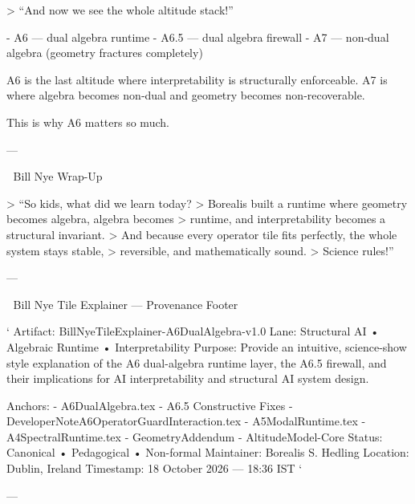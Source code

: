 > “And now we see the whole altitude stack!”

- A6 — dual algebra runtime  
- A6.5 — dual algebra firewall  
- A7 — non‑dual algebra (geometry fractures completely)

A6 is the last altitude where interpretability is structurally enforceable.  
A7 is where algebra becomes non‑dual and geometry becomes non‑recoverable.

This is why A6 matters so much.

---

🎉 Bill Nye Wrap-Up

> “So kids, what did we learn today?  
> Borealis built a runtime where geometry becomes algebra, algebra becomes
> runtime, and interpretability becomes a structural invariant.  
> And because every operator tile fits perfectly, the whole system stays stable,
> reversible, and mathematically sound.  
> Science rules!”

---

🍊 Bill Nye Tile Explainer — Provenance Footer

`
Artifact: BillNyeTileExplainer-A6DualAlgebra-v1.0
Lane: Structural AI • Algebraic Runtime • Interpretability
Purpose:
  Provide an intuitive, science-show style explanation of the A6 dual-algebra
  runtime layer, the A6.5 firewall, and their implications for AI
  interpretability and structural AI system design.

Anchors:
  - A6DualAlgebra.tex
  - A6.5 Constructive Fixes
  - DeveloperNoteA6OperatorGuardInteraction.tex
  - A5ModalRuntime.tex
  - A4SpectralRuntime.tex
  - GeometryAddendum
  - AltitudeModel-Core
Status: Canonical • Pedagogical • Non-formal
Maintainer: Borealis S. Hedling
Location: Dublin, Ireland
Timestamp: 18 October 2026 — 18:36 IST
`

---

